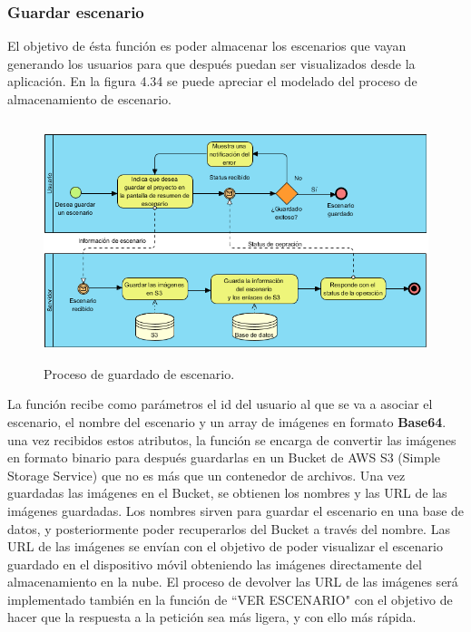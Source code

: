 \subsubsection{Guardar escenario}
El objetivo de ésta función es poder almacenar los escenarios que vayan generando los usuarios para que después puedan ser visualizados desde la aplicación. En la figura 4.34 se puede apreciar el modelado del proceso de almacenamiento de escenario. \par
\begin{figure}[h!]
	\centering
	\includegraphics[width=13cm,height=7cm]{imagenes/desarrollo/diagramas/BPMN_STORESC.png}
	\caption{Proceso de guardado de escenario.}
	\label{fig:regsuccess}
\end{figure}

La función recibe como parámetros el id del usuario al que se va a asociar el escenario, el nombre del escenario y un array de imágenes en formato \textbf{Base64}. una vez recibidos estos atributos, la función se encarga de convertir las imágenes en formato binario para después guardarlas en un Bucket de AWS S3 (Simple Storage Service) que no es más que un contenedor de archivos. Una vez guardadas las imágenes en el Bucket, se obtienen los nombres y las URL de las imágenes guardadas. Los nombres sirven para guardar el escenario en una base de datos, y posteriormente poder recuperarlos del Bucket a través del nombre. Las URL de las imágenes se envían con el objetivo de poder visualizar el escenario guardado en el dispositivo móvil obteniendo las imágenes directamente del almacenamiento en la nube. El proceso de devolver las URL de las imágenes será implementado también en la función de ``VER ESCENARIO" con el objetivo de hacer que la respuesta a la petición sea más ligera, y con ello más rápida.